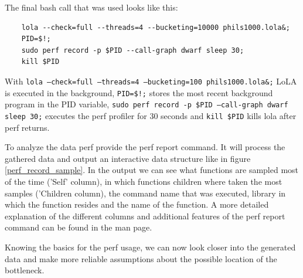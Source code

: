 The final bash call that was used looks like this:
\begin{lstlisting}
    lola --check=full --threads=4 --bucketing=10000 phils1000.lola&;
    PID=$!;
    sudo perf record -p $PID --call-graph dwarf sleep 30;
    kill $PID
\end{lstlisting}
With \texttt{lola --check=full --threads=4 --bucketing=100 phils1000.lola\&;} LoLA  is executed in the background, \texttt{PID=\$!;} stores the most recent background program in the PID variable, \texttt{sudo perf record -p \$PID --call-graph dwarf sleep 30;} executes the perf profiler for 30 seconds and \texttt{kill \$PID} kills lola after perf returns.

To analyze the data perf provide the perf report command. It will process the gathered data and output an interactive data structure like in figure \ref{perf_record_sample}. In the output we can see what functions are sampled most of the time ('Self' column), in which functions children where taken the most samples ('Children column), the command name that was executed, library in which the function resides and the name of the function. A more detailed explanation of the different columns and additional features of the perf report command can be found in the man page.

Knowing the basics for the perf usage, we can now look closer into the generated data and make more reliable assumptions about the possible location of the bottleneck.

